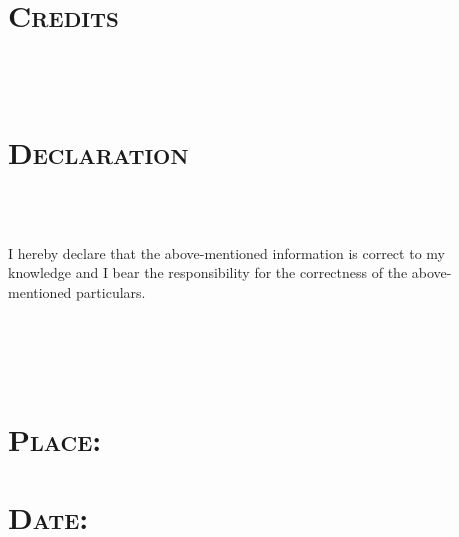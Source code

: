 \begin{resume}
\dates{}

\section{\textsc{Credits}}

\begin{formatb}
  \\
  \body\\
\end{formatb}

\dates{}
\begin{position}
\end{position}


\section{\textsc{Declaration}}

\begin{formatb}
  \\
  \body\\
\end{formatb}

I hereby declare that the above-mentioned information is
  correct to my knowledge and I bear the responsibility for the
  correctness of the above-mentioned particulars. \\\\\\\\\\

\section{\textsc{Place}:}

\section{\textsc{Date}:}
\begin{formatb}
  \\
  \body\\
\end{formatb}
\employer{}
\begin{position}
\end{position}


\end{resume}
